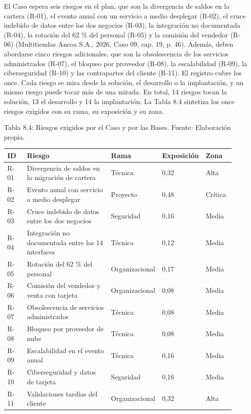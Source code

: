 \documentclass[11pt]{article}
\begin{document}
El Caso espera seis riesgos en el plan, que son la divergencia de saldos en la cartera (R-01), el evento anual con un servicio a medio desplegar (R-02), el cruce indebido de datos entre los dos negocios (R-03), la integración no documentada (R-04), la rotación del 62 \% del personal (R-05) y la comisión del vendedor (R-06) (Multitiendas Ancoa S.A., 2026, Caso 09, cap. 19, p. 46). Además, deben abordarse cinco riesgos adicionales, que son la obsolescencia de los servicios administrados (R-07), el bloqueo por proveedor (R-08), la escalabilidad (R-09), la ciberseguridad (R-10) y las contrapartes del cliente (R-11). El registro cubre los once. Cada riesgo se mira desde la solución, el desarrollo o la implantación, y un mismo riesgo puede tocar más de una mirada. En total, 14 riesgos tocan la solución, 13 el desarrollo y 14 la implantación. La Tabla 8.4 sintetiza los once riesgos exigidos con su rama, su exposición y su zona.

Tabla 8.4: Riesgos exigidos por el Caso y por las Bases. Fuente: Elaboración propia.\label{tab:8-4}

\begin{longtable}{p{0.097\linewidth}p{0.407\linewidth}p{0.155\linewidth}p{0.136\linewidth}p{0.136\linewidth}}
\toprule
\textbf{ID} & \textbf{Riesgo} & \textbf{Rama} & \textbf{Exposición} & \textbf{Zona} \\
\midrule
\endhead
\bottomrule
\endlastfoot
R-01 & Divergencia de saldos en la migración de cartera & Técnica & 0,32 & Alta \\
R-02 & Evento anual con servicio a medio desplegar & Proyecto & 0,48 & Crítica \\
R-03 & Cruce indebido de datos entre los dos negocios & Seguridad & 0,16 & Media \\
R-04 & Integración no documentada entre las 14 interfaces & Técnica & 0,12 & Media \\
R-05 & Rotación del 62 \% del personal & Organizacional & 0,17 & Media \\
R-06 & Comisión del vendedor y venta con tarjeta & Organizacional & 0,08 & Media \\
R-07 & Obsolescencia de servicios administrados & Técnica & 0,08 & Media \\
R-08 & Bloqueo por proveedor de nube & Técnica & 0,08 & Media \\
R-09 & Escalabilidad en el evento anual & Técnica & 0,16 & Media \\
R-10 & Ciberseguridad y datos de tarjeta & Seguridad & 0,16 & Media \\
R-11 & Validaciones tardías del cliente & Organizacional & 0,32 & Alta \\
\end{longtable}
\end{document}
